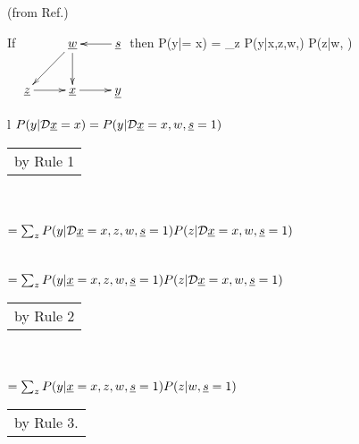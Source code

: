 \begin{claim}(from Ref.\cite{hunermund2021})

If $
\xymatrix{
&\rvw\ar[dl]\ar[d]
&\rvs\ar[l]
\\
\rvz\ar[r]
&\rvx\ar[r]
&\rvy
}$ then
\beq
P(y|\cald \rvx = x)
=
 \sum_z P(y|x,z,w,)
P(z|w, )
\eeq

\beq
{}
\eeq
\end{claim}
\proof
\begin{longtable}{l}
\color{red}
$P(y|{\cal D}{\underline{x}}=x)=P(y|{\cal D}{\underline{x}}=x, w, {\underline{s}}=1)$
\\
\xymatrix{
\\
=
}
\begin{tabular}{l}
by Rule 1
\end{tabular}
\\
\\
\color{red}
$=\sum_z P(y|{\cal D}{\underline{x}}=x,z,w,{\underline{s}}=1)
P(z|{\cal D}{\underline{x}}=x, w, {\underline{s}}=1)$
\\
\xymatrix{\\=}
\\
\\
\color{red}
$=\sum_z P(y|{\underline{x}}=x,z,w,{\underline{s}}=1)
P(z|{\cal D}{\underline{x}}=x, w, {\underline{s}}=1)$
\\
\xymatrix{\\=}
\begin{tabular}{l}
\\
by Rule 2
\end{tabular}
\\
\\
\color{red}
$=\sum_z P(y|{\underline{x}}=x,z,w,{\underline{s}}=1)
P(z| w, {\underline{s}}=1)$
\\
\xymatrix{\\=}
\begin{tabular}{l}\\
by Rule 3.
\end{tabular}
\end{longtable}

